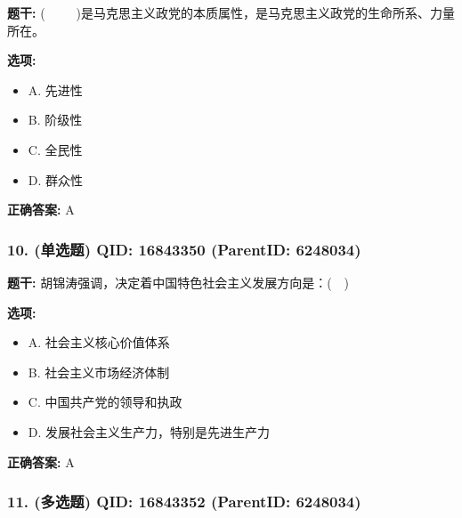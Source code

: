\documentclass[12pt,UTF8]{ctexart}
\begin{document}
\textbf{题干:}
(     )是马克思主义政党的本质属性，是马克思主义政党的生命所系、力量所在。



\textbf{选项:}
\begin{itemize}[leftmargin=*]

  \item A. 先进性

  \item B. 阶级性

  \item C. 全民性

  \item D. 群众性

\end{itemize}

\textbf{正确答案:}
A

\vspace{0.3em}\hrulefill\vspace{0.7em}

\subsubsection*{10. (单选题) \small QID: 16843350 (ParentID: 6248034)}

\textbf{题干:}
胡锦涛强调，决定着中国特色社会主义发展方向是：(  )



\textbf{选项:}
\begin{itemize}[leftmargin=*]

  \item A. 社会主义核心价值体系

  \item B. 社会主义市场经济体制

  \item C. 中国共产党的领导和执政

  \item D. 发展社会主义生产力，特别是先进生产力

\end{itemize}

\textbf{正确答案:}
A

\vspace{0.3em}\hrulefill\vspace{0.7em}

\subsubsection*{11. (多选题) \small QID: 16843352 (ParentID: 6248034)}
\end{document}
